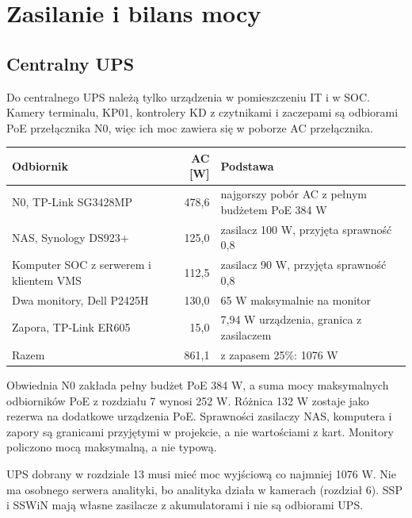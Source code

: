\section{Zasilanie i bilans mocy}


\subsection*{Centralny UPS}
Do centralnego UPS należą tylko urządzenia w pomieszczeniu IT i w SOC. Kamery terminalu, KP01, kontrolery KD z czytnikami i zaczepami są odbiorami PoE przełącznika N0, więc ich moc zawiera się w poborze AC przełącznika.
\begin{center}
\small
\begin{tabularx}{\linewidth}{@{}lrY@{}}
\toprule
Odbiornik & AC [W] & Podstawa \\
\midrule
N0, TP-Link SG3428MP & 478,6 & najgorszy pobór AC z pełnym budżetem PoE 384 W \\
NAS, Synology DS923+ & 125,0 & zasilacz 100 W, przyjęta sprawność 0,8 \\
Komputer SOC z serwerem i klientem VMS & 112,5 & zasilacz 90 W, przyjęta sprawność 0,8 \\
Dwa monitory, Dell P2425H & 130,0 & 65 W maksymalnie na monitor \\
Zapora, TP-Link ER605 & 15,0 & 7,94 W urządzenia, granica z zasilaczem \\
\midrule
Razem & 861,1 & z zapasem 25\%: 1076 W \\
\bottomrule
\end{tabularx}
\end{center}
Obwiednia N0 zakłada pełny budżet PoE 384 W, a suma mocy maksymalnych odbiorników PoE z rozdziału 7 wynosi 252 W. Różnica 132 W zostaje jako rezerwa na dodatkowe urządzenia PoE. Sprawności zasilaczy NAS, komputera i zapory są granicami przyjętymi w projekcie, a nie wartościami z kart. Monitory policzono mocą maksymalną, a nie typową.\cite{S-SW,S-NAS,S-PC,S-MON,S-FW}

UPS dobrany w rozdziale 13 musi mieć moc wyjściową co najmniej 1076 W. Nie ma osobnego serwera analityki, bo analityka działa w kamerach (rozdział 6). SSP i SSWiN mają własne zasilacze z akumulatorami i nie są odbiorami UPS.\cite{S-FIRE,S-SSWIN}

